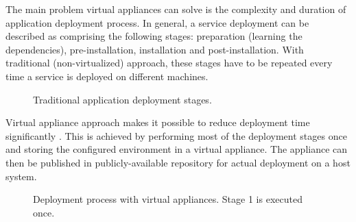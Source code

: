 \documentclass[11pt]{book}
\begin{document}
        The main problem virtual appliances can solve is the complexity and duration of application deployment process.
        In general, a service deployment can be described as comprising the following stages: preparation (learning the
        dependencies), pre-installation, installation and post-installation. With traditional (non-virtualized)
        approach, these stages have to be repeated every time a service is deployed on different machines.

        \begin{figure}[H]
          \begin{center}
          \end{center}

          \caption{Traditional application deployment stages.}
        \end{figure}


        Virtual appliance approach makes it possible to reduce deployment time significantly \cite{changhua}. This is
        achieved by performing most of the deployment stages once and storing the configured environment in a virtual
        appliance. The appliance can then be published in publicly-available repository for actual deployment on a host
        system.

        \begin{figure}[H]
          \begin{center}
          \end{center}

          \caption{Deployment process with virtual appliances. Stage 1 is executed once.}
        \end{figure}
\end{document}
